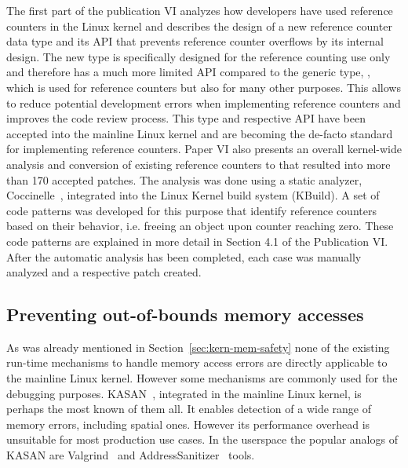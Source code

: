 The first part of the publication VI analyzes how developers have used reference counters in the Linux kernel and describes the design of a new reference counter data type  and its API that prevents reference counter overflows by its internal design. 
The new type is specifically designed for the reference counting use only and therefore has a much more limited API compared to the generic type, , which is used for reference counters but also for many other purposes. This allows to reduce potential development errors when implementing reference counters and improves the code review process.   
This type and respective API have been accepted into the mainline Linux kernel and are becoming the de-facto standard for implementing reference counters. 
Paper VI also presents an overall kernel-wide analysis and conversion of existing reference counters to  that resulted into more than 170 accepted patches. The analysis was done using a static analyzer, Coccinelle~\cite{coccinelle}, integrated into the Linux Kernel build system (KBuild). A set of code patterns was developed for this purpose that identify reference counters based on their behavior, i.e. freeing an object upon counter reaching zero. These code patterns are explained in more detail in Section 4.1 of the Publication VI. After the automatic analysis has been completed, each case was manually analyzed and a respective patch created. 


\subsection{Preventing out-of-bounds memory accesses}
\label{sec:kern-mem-out-of-bounds}

As was already mentioned in Section~\ref{sec:kern-mem-safety} none of the existing run-time mechanisms to handle memory access errors are directly applicable to the mainline Linux kernel. However some mechanisms are commonly used for the debugging purposes.
KASAN~\cite{kasan}, integrated in the mainline Linux kernel, is perhaps the most known of them all. It enables detection of a wide range of memory errors, including spatial ones. However its performance overhead is unsuitable for most production use cases.
In the userspace the popular analogs of KASAN are Valgrind~\cite{nethercote2007valgrind} and AddressSanitizer~\cite{serebryany2012addresssanitizer} tools. 

